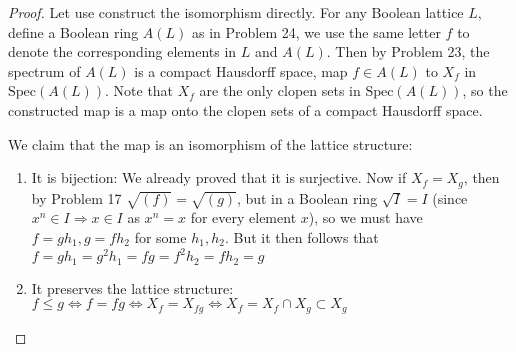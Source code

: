 \documentclass{solution}
\begin{document}
\begin{proof}
    Let use construct the isomorphism directly. For any Boolean lattice $L$, define a Boolean ring $A(L)$ as in Problem 24, we use the same letter $f$ to denote the corresponding elements in $L$ and $A(L)$. Then by Problem 23, the spectrum of $A(L)$ is a compact Hausdorff space, map $f \in A(L)$ to $X_f$ in $\mathrm{Spec}(A(L))$. Note that $X_f$ are the only clopen sets in $\mathrm{Spec}(A(L))$, so the constructed map is a map onto the clopen sets of a compact Hausdorff space.

    We claim that the map is an isomorphism of the lattice structure:
    \begin{enumerate}
        \item It is bijection: We already proved that it is surjective. Now if $X_f = X_g$, then by Problem 17 $\sqrt{(f)} = \sqrt{(g)}$, but in a Boolean ring $\sqrt{I} = I$ (since $x^n \in I \Rightarrow x \in I$ as $x^n = x$ for every element $x$), so we must have $f = gh_1, g = fh_2$ for some $h_1, h_2$. But it then follows that $f = gh_1 = g^2h_1 = fg = f^2h_2 = fh_2 = g$
        \item It preserves the lattice structure: $f \le g \Leftrightarrow f = fg \Leftrightarrow X_f = X_{fg} \Leftrightarrow X_{f} = X_f \cap X_g \subset X_g$
    \end{enumerate}
\end{proof}
\end{document}
